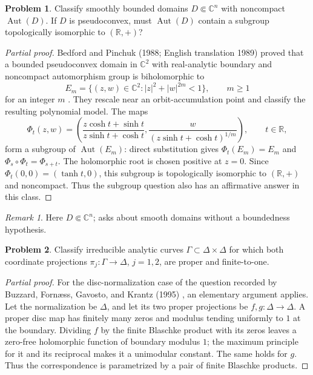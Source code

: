 \documentclass[11pt,reqno]{amsart}
\theoremstyle{definition}
\newtheorem{problem}{Problem}[section]
\theoremstyle{remark}
\newtheorem*{remark}{Remark}
\begin{document}
\begin{problem}\label{b95-9-1-1}\label{FS-3.17}
Classify smoothly bounded domains $D\Subset\mathbb C^n$ with noncompact $\operatorname{Aut}(D)$. If $D$ is pseudoconvex, must $\operatorname{Aut}(D)$ contain a subgroup topologically isomorphic to $(\mathbb R,+)$?
\end{problem}
\begin{proof}[Partial proof]
Bedford and Pinchuk (1988; English translation 1989) proved that a bounded pseudoconvex domain in $\mathbb C^2$ with real-analytic boundary and noncompact automorphism group is biholomorphic to
\[
 E_m=\{(z,w)\in\mathbb C^2:|z|^2+|w|^{2m}<1\},\qquad m\geq1
\]
for an integer $m$ \cite{B95-BedfordPinchuk}. They rescale near an orbit-accumulation point and classify the resulting polynomial model. The maps
\[
 \Phi_t(z,w)=\left(
 \frac{z\cosh t+\sinh t}{z\sinh t+\cosh t},
 \frac{w}{(z\sinh t+\cosh t)^{1/m}}
 \right),\qquad t\in\mathbb R,
\]
form a subgroup of $\operatorname{Aut}(E_m)$: direct substitution gives $\Phi_t(E_m)=E_m$ and $\Phi_s\circ\Phi_t=\Phi_{s+t}$. The holomorphic root is chosen positive at $z=0$. Since $\Phi_t(0,0)=(\tanh t,0)$, this subgroup is topologically isomorphic to $(\mathbb R,+)$ and noncompact. Thus the subgroup question also has an affirmative answer in this class.
\end{proof}
\begin{remark}
Here $D\Subset\mathbb C^n$; \cite[Problem~9.1.1]{B95} asks about smooth domains without a boundedness hypothesis.
\end{remark}

\begin{problem}\label{b95-9-3-1}
Classify irreducible analytic curves $\Gamma\subset\Delta\times\Delta$ for which both coordinate projections $\pi_j:\Gamma\to\Delta$, $j=1,2$, are proper and finite-to-one.
\end{problem}
\begin{proof}[Partial proof]
For the disc-normalization case of the question recorded by Buzzard, Forn\ae ss, Gavosto, and Krantz (1995) \cite[Problem~9.3.1]{B95}, an elementary argument applies. Let the normalization be $\Delta$, and let its two proper projections be $f,g:\Delta\to\Delta$. A proper disc map has finitely many zeros and modulus tending uniformly to $1$ at the boundary. Dividing $f$ by the finite Blaschke product with its zeros leaves a zero-free holomorphic function of boundary modulus $1$; the maximum principle for it and its reciprocal makes it a unimodular constant. The same holds for $g$. Thus the correspondence is parametrized by a pair of finite Blaschke products.
\end{proof}
\end{document}
